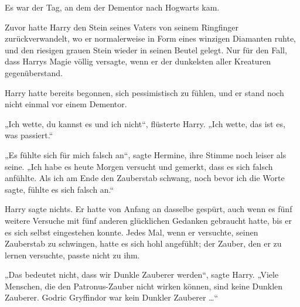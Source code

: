 Es war der Tag, an dem der Dementor nach Hogwarts kam.

Zuvor hatte Harry den Stein seines Vaters von seinem Ringfinger zurückverwandelt, wo er normalerweise in Form eines winzigen Diamanten ruhte, und den riesigen grauen Stein wieder in seinen Beutel gelegt. Nur für den Fall, dass Harrys Magie völlig versagte, wenn er der dunkelsten aller Kreaturen gegenüberstand.

Harry hatte bereits begonnen, sich pessimistisch zu fühlen, und er stand noch nicht einmal vor einem Dementor.

„Ich wette, du kannst es und ich nicht“, flüsterte Harry.
„Ich wette, das ist es, was passiert.“

„Es fühlte sich für mich falsch an“, sagte Hermine, ihre Stimme noch leiser als seine.
„Ich habe es heute Morgen versucht und gemerkt, dass es sich falsch anfühlte. Als ich am Ende den Zauberstab schwang, noch bevor ich die Worte sagte, fühlte es sich falsch an.“

Harry sagte nichts. Er hatte von Anfang an dasselbe gespürt, auch wenn es fünf weitere Versuche mit fünf anderen glücklichen Gedanken gebraucht hatte, bis er es sich selbst eingestehen konnte. Jedes Mal, wenn er versuchte, seinen Zauberstab zu schwingen, hatte es sich hohl angefühlt; der Zauber, den er zu lernen versuchte, passte nicht zu ihm.

„Das bedeutet nicht, dass wir Dunkle Zauberer werden“, sagte Harry.
„Viele Menschen, die den Patronus-Zauber nicht wirken können, sind keine Dunklen Zauberer. Godric Gryffindor war kein Dunkler Zauberer …“

